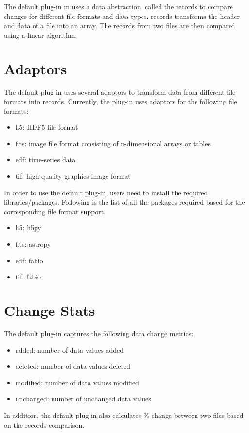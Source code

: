 The default plug-in in \systemname uses a data abstraction, called
the \systemname records to compare changes for different file formats
and data types. \systemname records transforms the header and data
of a file into an array. The records from two files are then compared
using a linear algorithm.

\section{Adaptors}

The default plug-in uses several adaptors to transform data from
different file formats into \systemname records. Currently, the
plug-in uses adaptors for the following file formats:
\begin{itemize} 
\item h5: HDF5 file format
\item fits: image file format consisting of n-dimensional arrays or tables
\item edf: time-series data
\item tif: high-quality graphics image format
\end{itemize} 

In order to use the default plug-in, users need to install the
required libraries/packages. Following is the list of all the
packages required based for the corresponding file format support.

\begin{itemize} 
\item h5: h5py
\item fits: astropy
\item edf: fabio
\item tif: fabio
\end{itemize}

\section{Change Stats}

The default plug-in captures the following data change metrics:
\begin{itemize} 
\item added:     number of data values added
\item deleted:   number of data values deleted
\item modified:  number of data values modified
\item unchanged: number of unchanged data values 
\end{itemize}

In addition, the default plug-in also calculates \% change
between two files based on the \systemname records comparison.



